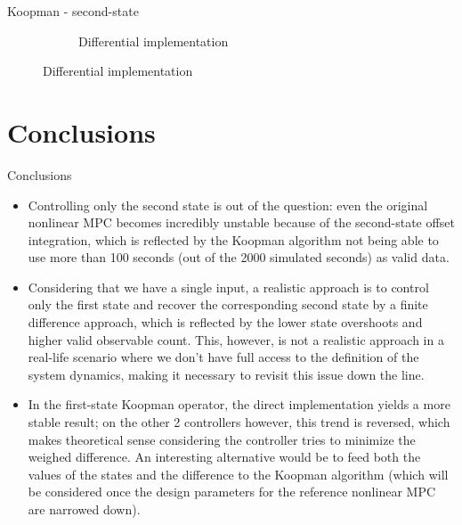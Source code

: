 \documentclass{beamer}
\begin{document}
\begin{frame}{Koopman - second-state}
\begin{figure}
\begin{subfigure}[b]{0.45\textwidth}
            \caption{Differential implementation}
        \end{subfigure}
    \end{figure}
\end{frame}


\section{Conclusions}

\begin{frame}[allowframebreaks]{Conclusions}
    \begin{itemize}
        \item Controlling only the second state is out of the question: even the original nonlinear MPC becomes incredibly unstable because of the second-state offset integration, which is reflected by the Koopman algorithm not being able to use more than 100 seconds (out of the 2000 simulated seconds) as valid data.
        \item Considering that we have a single input, a realistic approach is to control only the first state and recover the corresponding second state by a finite difference approach, which is reflected by the lower state overshoots and higher valid observable count. This, however, is not a realistic approach in a real-life scenario where we don't have full access to the definition of the system dynamics, making it necessary to revisit this issue down the line.
        \item In the first-state Koopman operator, the direct implementation yields a more stable result; on the other 2 controllers however, this trend is reversed, which makes theoretical sense considering the controller tries to minimize the weighed difference. An interesting alternative would be to feed both the values of the states and the difference to the Koopman algorithm (which will be considered once the design parameters for the reference nonlinear MPC are narrowed down).
    \end{itemize}
\end{frame}
\end{document}
